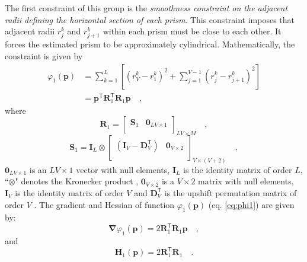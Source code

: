 The first constraint of this group is the \textit{smoothness constraint on the adjacent radii defining the horizontal section of each prism}. This constraint imposes that adjacent radii $r_{j}^{k}$ and $r_{j+1}^{k}$ within each prism must be close to each other. It forces the estimated prism to be approximately cylindrical. Mathematically, the constraint is given by \begin{equation}\label{eq:phi1}
\begin{split}
\varphi_{1}(\mathbf{p}) &= \sum\limits^{L}_{k=1}\left[\left(r^{k}_{V}-r^{k}_{1}\right)^2 + \sum\limits^{V-1}_{j=1}\left(r^{k}_{j}-r^{k}_{j+1}\right)^2\right]\\
 &= \mathbf{p}^{\mathsf{T}} \mathbf{R}^{\mathsf{T}}_{1}\mathbf{R}_{1} \mathbf{p} \quad ,
\end{split}
\end{equation}
where
\begin{equation}
\mathbf{R}_{1} = 
\begin{bmatrix}
\mathbf{S}_{1} &
\mathbf{0}_{LV \times 1} \\
\end{bmatrix}_{LV \times M} \quad ,
\label{eq:R1-matrix}
\end{equation}
\begin{equation}
\mathbf{S}_{1} = 
\mathbf{I}_{L} \otimes 
\begin{bmatrix}
\left( \mathbf{I}_{V} - \mathbf{D}_{V}^\mathsf{T} \right) & \mathbf{0}_{V \times 2} \\
\end{bmatrix}_{V \times (V+2)} \quad ,
\label{eq:S1-matrix}
\end{equation}
$ \mathbf{0}_{LV \times 1} $ is an $ LV \times 1 $ vector with null elements,
$\mathbf{I}_{L}$ is the identity matrix of order $L$, ``$\otimes$" denotes the Kronecker product \cite[][ p. 243]{horn_johnson1991}, $\mathbf{0}_{V \times 2}$ is a $V \times 2$ matrix with null elements, 
$\mathbf{I}_{V}$ is the identity matrix of order $V$ and $\mathbf{D}_{V}^\mathsf{T}$ is the upshift permutation matrix of order $V$ \cite[][ p. 20]{golub-vanloan2013}. The gradient and Hessian of function $\varphi_{1}(\mathbf{p})$ (eq. \ref{eq:phi1}) are given by:
\begin{equation}\label{eq:phi1_grad}
\boldsymbol{\nabla}\varphi_{1}(\mathbf{p}) = 2 \mathbf{R}^\mathsf{T}_{1}\mathbf{R}_{1}\mathbf{p} \quad ,
\end{equation}
and
\begin{equation}\label{eq:phi1_hessian}
\mathbf{H}_{1}(\mathbf{p}) = 2\mathbf{R}^\mathsf{T}_{1}\mathbf{R}_{1} \quad .
\end{equation}

